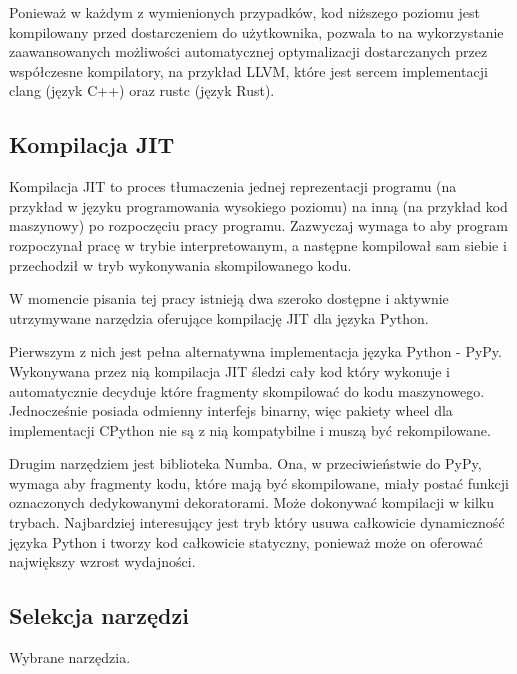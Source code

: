 \documentclass[11pt, a4paper]{article}
\begin{document}
\begin{sloppypar}
    Ponieważ w każdym z wymienionych przypadków, kod niższego poziomu jest kompilowany przed
    dostarczeniem do użytkownika, pozwala to na wykorzystanie zaawansowanych możliwości
    automatycznej optymalizacji dostarczanych przez współczesne kompilatory, na przykład
    LLVM, które jest sercem implementacji clang\cite{ClangHomePage} (język C++) oraz rustc
    (język Rust).

    \subsection{Kompilacja JIT}
    Kompilacja JIT to proces tłumaczenia jednej reprezentacji programu (na przykład w
    języku programowania wysokiego poziomu) na inną (na przykład kod maszynowy) po rozpoczęciu
    pracy programu. Zazwyczaj wymaga to aby program rozpoczynał pracę w trybie
    interpretowanym, a następne kompilował sam siebie i przechodził w tryb wykonywania skompilowanego
    kodu.

    W momencie pisania tej pracy istnieją dwa szeroko dostępne i aktywnie utrzymywane narzędzia
    oferujące kompilację JIT dla języka Python.

    Pierwszym z nich jest pełna alternatywna implementacja języka Python - PyPy\cite{PyPy_Home_Page}.
    Wykonywana przez nią kompilacja JIT śledzi cały kod który wykonuje i automatycznie decyduje
    które fragmenty skompilować do kodu maszynowego\cite{PyPy_JIT}. Jednocześnie posiada
    odmienny interfejs binarny, więc pakiety wheel dla implementacji CPython nie są z
    nią kompatybilne i muszą być rekompilowane.

    Drugim narzędziem jest biblioteka Numba\cite{Numba_Article}\cite{Numba_Doc}. Ona, w
    przeciwieństwie do PyPy, wymaga aby fragmenty kodu, które mają być skompilowane, miały
    postać funkcji oznaczonych dedykowanymi dekoratorami. Może dokonywać kompilacji w
    kilku trybach. Najbardziej interesujący jest tryb który usuwa całkowicie dynamiczność
    języka Python i tworzy kod całkowicie statyczny, ponieważ może on oferować
    największy wzrost wydajności.

    \subsection{Selekcja narzędzi}
    \FloatBarrier
    \begin{table}[ht]
      \centering
      
      \caption{Wybrane narzędzia.}
      \label{selected-tool}
    \end{table}
    \FloatBarrier


\end{sloppypar}
\end{document}
